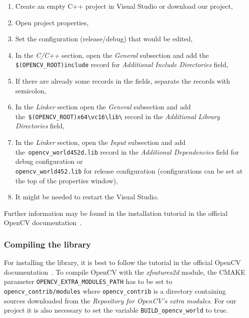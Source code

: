 \documentclass[thesis=B,english]{FITthesis}[2019/12/23]
\begin{document}
                \begin{enumerate}
                    \item Create an empty C++ project in Visual Studio or download our project,
                    \item Open project properties,
                    \item Set the configuration (release/debug) that would be edited,
                    \item In the \textit{C/C++} section, open the \textit{General} subsection and add the \texttt{\$(OPENCV\_ROOT)include} record for \textit{Additional Include Directories} field,
                    \item If there are already some records in the fields, separate the records with semicolon,
                    \item In the \textit{Linker} section open the \textit{General} subsection and add \\ the~\texttt{\$(OPENCV\_ROOT)x64\textbackslash vc16\textbackslash lib\textbackslash} record in the \textit{Additional Library Directories} field,
                    \item In the \textit{Linker} section, open the \textit{Input} subsection and add \\ the~\texttt{opencv\_world452d.lib} record in the \textit{Additional Dependencies} field for debug configuration or \\\texttt{opencv\_world452.lib} for release configuration (configurations can be set at the top of the properties window),
                    \item It might be needed to restart the Visual Studio.
                \end{enumerate}
                Further information may be found in the installation tutorial in the official OpenCV documentation~\cite{Gábor2021}.
            
            \subsubsection*{Compiling the library}
                For installing the library, it is best to follow the tutorial in the official OpenCV documentation~\cite{Gábor2021}. To compile OpenCV with the \textit{xfeatures2d} module, the CMAKE parameter \texttt{OPENCV\_EXTRA\_MODULES\_PATH} has to be set to \\ \texttt{opencv\_contrib/modules} where \texttt{opencv\_contrib} is a directory containing sources downloaded from the \textit{Repository for OpenCV's extra modules}. For our project it is also necessary to set the variable \texttt{BUILD\_opencv\_world} to true.
\end{document}
